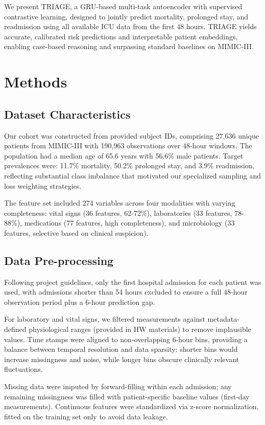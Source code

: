\documentclass{article}
\theoremstyle{plain}
\theoremstyle{definition}
\theoremstyle{remark}
\begin{document}
We present TRIAGE, a GRU-based multi-task autoencoder with supervised contrastive learning, designed to jointly predict mortality, prolonged stay, and readmission using all available ICU data from the first 48 hours. TRIAGE yields accurate, calibrated risk predictions and interpretable patient embeddings, enabling case-based reasoning and surpassing standard baselines on MIMIC-III.

\section{Methods}
\subsection{Dataset Characteristics}

Our cohort was constructed from provided subject IDs, comprising 27,636 unique patients from MIMIC-III with 190,963 observations over 48-hour windows. The population had a median age of 65.6 years with 56.6\% male patients. Target prevalences were: 11.7\% mortality, 50.2\% prolonged stay, and 3.9\% readmission, reflecting substantial class imbalance that motivated our specialized sampling and loss weighting strategies.

The feature set included 274 variables across four modalities with varying completeness: vital signs (36 features, 62-72\%), laboratories (33 features, 78-88\%), medications (77 features, high completeness), and microbiology (33 features, selective based on clinical suspicion).

\subsection{Data Pre-processing}

Following project guidelines, only the first hospital admission for each patient was used, with admissions shorter than 54 hours excluded to ensure a full 48-hour observation period plus a 6-hour prediction gap.

For laboratory and vital signs, we filtered measurements against metadata-defined physiological ranges (provided in HW materials) to remove implausible values. Time stamps were aligned to non-overlapping 6-hour bins, providing a balance between temporal resolution and data sparsity: shorter bins would increase missingness and noise, while longer bins obscure clinically relevant fluctuations.

Missing data were imputed by forward-filling within each admission; any remaining missingness was filled with patient-specific baseline values (first-day measurements). Continuous features were standardized via z-score normalization, fitted on the training set only to avoid data leakage.
\end{document}
